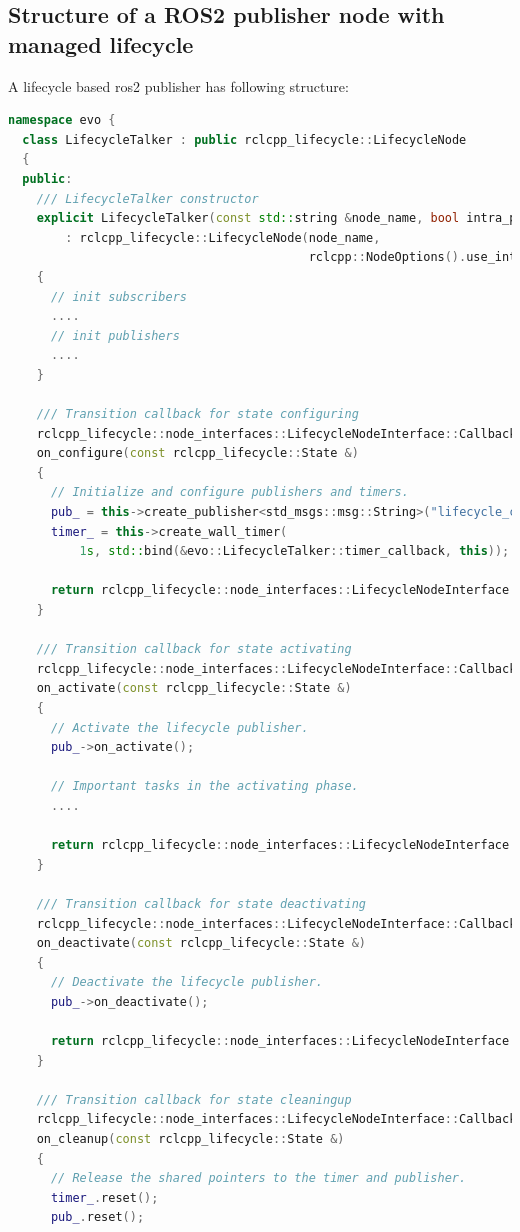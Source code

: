 \subsection{Structure of a ROS2 publisher node with managed lifecycle}
A lifecycle based ros2 publisher has following structure:
\begin{lstlisting}[language=cpp]
namespace evo {
  class LifecycleTalker : public rclcpp_lifecycle::LifecycleNode
  {
  public:
    /// LifecycleTalker constructor
    explicit LifecycleTalker(const std::string &node_name, bool intra_process_comms = false)
        : rclcpp_lifecycle::LifecycleNode(node_name,
                                          rclcpp::NodeOptions().use_intra_process_comms(intra_process_comms))
    {
      // init subscribers
      ....
      // init publishers
      ....
    }
  
    /// Transition callback for state configuring
    rclcpp_lifecycle::node_interfaces::LifecycleNodeInterface::CallbackReturn
    on_configure(const rclcpp_lifecycle::State &)
    {
      // Initialize and configure publishers and timers.
      pub_ = this->create_publisher<std_msgs::msg::String>("lifecycle_chatter", 10);
	  timer_ = this->create_wall_timer(
          1s, std::bind(&evo::LifecycleTalker::timer_callback, this));

      return rclcpp_lifecycle::node_interfaces::LifecycleNodeInterface::CallbackReturn::SUCCESS;
    }

    /// Transition callback for state activating
    rclcpp_lifecycle::node_interfaces::LifecycleNodeInterface::CallbackReturn
    on_activate(const rclcpp_lifecycle::State &)
    {
      // Activate the lifecycle publisher.
      pub_->on_activate();

      // Important tasks in the activating phase.
	  ....
 
      return rclcpp_lifecycle::node_interfaces::LifecycleNodeInterface::CallbackReturn::SUCCESS;
    }

    /// Transition callback for state deactivating
    rclcpp_lifecycle::node_interfaces::LifecycleNodeInterface::CallbackReturn
    on_deactivate(const rclcpp_lifecycle::State &)
    {
      // Deactivate the lifecycle publisher.
      pub_->on_deactivate();

      return rclcpp_lifecycle::node_interfaces::LifecycleNodeInterface::CallbackReturn::SUCCESS;
    }

    /// Transition callback for state cleaningup
    rclcpp_lifecycle::node_interfaces::LifecycleNodeInterface::CallbackReturn
    on_cleanup(const rclcpp_lifecycle::State &)
    {
      // Release the shared pointers to the timer and publisher. 
      timer_.reset();
      pub_.reset();


\end{lstlisting}
